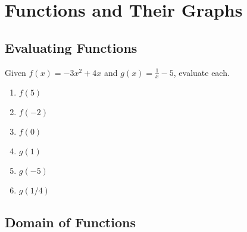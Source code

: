 \chapter{Functions and Their Graphs}

\section{Evaluating Functions}

Given $f(x) = -3x^2 + 4x$ and $g(x) = \frac{1}{x}-5$, evaluate each.
\begin{enumerate}
	\item $f(5)$
	\item $f(-2)$
	\item $f(0)$
	\item $g(1)$
	\item $g(-5)$
	\item $g(1/4)$
\end{enumerate}

\section{Domain of Functions}

